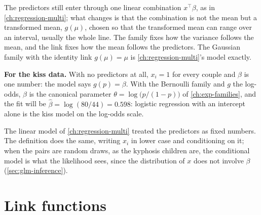 \begin{inwords}
The predictors still enter through one linear combination $x^\top\beta$, as in \cref{ch:regression-multi}; what changes is that the combination is not the mean but a transformed mean, $g(\mu)$, chosen so that the transformed mean can range over an interval, usually the whole line. The family fixes how the variance follows the mean, and the link fixes how the mean follows the predictors. The Gaussian family with the identity link $g(\mu) = \mu$ is \cref{ch:regression-multi}'s model exactly.

\textbf{For the kiss data.} With no predictors at all, $x_i = 1$ for every couple and $\beta$ is one number: the model says $g(p) = \beta$. With the Bernoulli family and $g$ the log-odds, $\beta$ is the canonical parameter $\theta = \log\big(p/(1-p)\big)$ of \cref{ch:exp-families}, and the fit will be $\hat{\beta} = \log(80/44) = 0.598$: logistic regression with an intercept alone is the kiss model on the log-odds scale.
\end{inwords}

The linear model of \cref{ch:regression-multi} treated the predictors as fixed numbers.
The definition does the same, writing $x_i$ in lower case and conditioning on it; when the pairs are random draws, as the kyphosis children are, the conditional model is what the likelihood sees, since the distribution of $x$ does not involve $\beta$ (\cref{sec:glm-inference}).

\section{Link functions}
\label{sec:glm-links}

